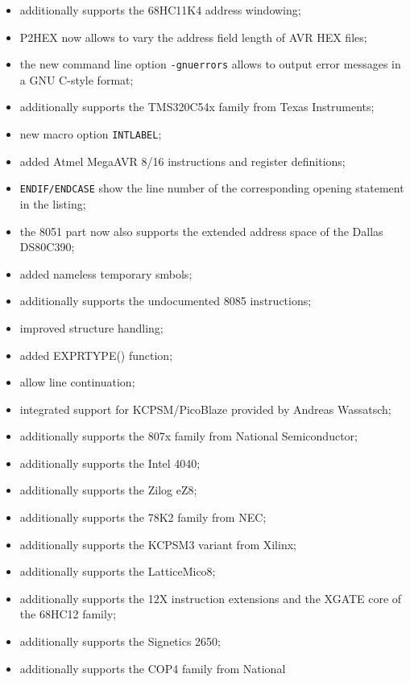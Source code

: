 \documentclass[12pt,twoside]{report}
\begin{document}
\begin{itemize}
{\begin{itemize}
      \item{additionally supports the 68HC11K4 address windowing;}
      \item{P2HEX now allows to vary the address field length of AVR HEX
            files;}
      \item{the new command line option {\tt -gnuerrors} allows to output
            error messages in a GNU C-style format;}
      \item{additionally supports the TMS320C54x family from Texas
            Instruments;}
      \item{new macro option {\tt INTLABEL};}
      \item{added Atmel MegaAVR 8/16 instructions and register
            definitions;}
      \item{{\tt ENDIF/ENDCASE} show the line number of the corresponding
            opening statement in the listing;}
      \item{the 8051 part now also supports the extended address space of
            the Dallas DS80C390;}
      \item{added nameless temporary smbols;}
      \item{additionally supports the undocumented 8085 instructions;}
      \item{improved structure handling;}
      \item{added EXPRTYPE() function;}
      \item{allow line continuation;}
      \item{integrated support for KCPSM/PicoBlaze provided by Andreas
            Wassatsch;}
      \item{additionally supports the 807x family from National
            Semiconductor;}
      \item{additionally supports the Intel 4040;}
      \item{additionally supports the Zilog eZ8;}
      \item{additionally supports the 78K2 family from NEC;}
      \item{additionally supports the KCPSM3 variant from Xilinx;}
      \item{additionally supports the LatticeMico8;}
      \item{additionally supports the 12X instruction extensions and the
            XGATE core of the 68HC12 family;}
      \item{additionally supports the Signetics 2650;}
      \item{additionally supports the COP4 family from National
}
\end{itemize}}
\end{itemize}
\end{document}
